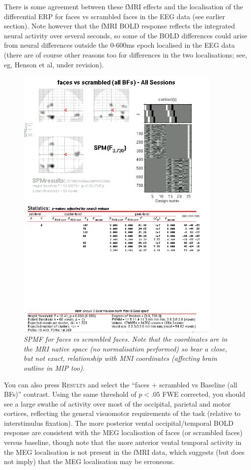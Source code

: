There is some agreement between these fMRI effects and the localisation of the differential ERP for faces vs scrambled faces in the EEG data (see earlier section). Note however that the fMRI BOLD response reflects the integrated neural activity over several seconds, so some of the BOLD differences could arise from neural differences outside the 0-600ms epoch localised in the EEG data (there are of course other reasons too for differences in the two localisations; see, eg, Henson et al, under revision).

\begin{figure}
\begin{center}
\includegraphics[width=100mm]{multimodal/figures/fmri_faces_vs_scrambled}
\caption{\em  SPM{F} for faces vs scrambled faces. Note that the coordinates are in the MRI native space (no normalisation performed) so bear a close, but not exact, relationship with MNI coordinates (affecting brain outline in MIP too).\label{multimodal:fig:22}}
\end{center}
\end{figure}

You can also press \textsc{Results} and select the ``faces + scrambled vs Baseline (all BFs)'' contrast. Using the same threshold of $p<.05$ FWE corrected, you should see a large swathe of activity over most of the occipital, parietal and motor cortices, reflecting the general visuomotor requirements of the task (relative to interstimulus fixation). The more posterior vental occipital/temporal BOLD response are consistent with the MEG localisation of faces (or scrambled faces) versus baseline, though note that the more anterior vental temporal activity in the MEG localisation is not present in the fMRI data, which suggests (but does not imply) that the MEG localisation may be erroneous.

